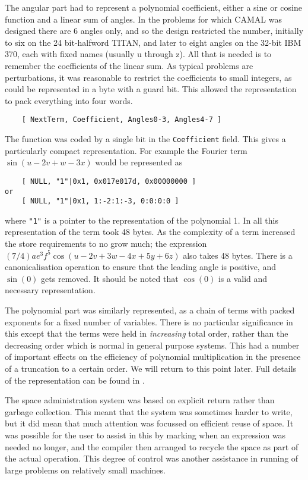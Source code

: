 The angular part had to represent a polynomial coefficient, either a
sine or cosine function and a linear sum of angles.  In the problems
for which CAMAL was designed there are 6 angles only, and so the
design restricted the number, initially to six on the 24 bit-halfword
TITAN, and later to eight angles on the 32-bit IBM 370, each with
fixed names (usually u through z).  All that is needed is to remember
the coefficients of the linear sum.  As typical problems are
perturbations, it was reasonable to restrict the coefficients to small
integers, as could be represented in a byte with a guard bit.  This
allowed the representation to pack everything into four words.
\begin{verbatim}
    [ NextTerm, Coefficient, Angles0-3, Angles4-7 ]
\end{verbatim}
The function was coded by a single bit in the {\tt Coefficient} field.  This
gives a particularly compact representation.  For example the Fourier
term $\sin(u-2v+w-3x)$ would be represented as
\begin{verbatim}
    [ NULL, "1"|0x1, 0x017e017d, 0x00000000 ]
or
    [ NULL, "1"|0x1, 1:-2:1:-3, 0:0:0:0 ]
\end{verbatim}
where {\tt "1"} is a pointer to the representation of the polynomial
1.  In all this representation of the term took 48 bytes.  As the
complexity of a term increased the store requirements to no grow much;
the expression $(7/4) a e^3 f^5 \cos(u-2v+3w-4x+5y+6z)$ also takes 48
bytes.  There is a canonicalisation operation to ensure that the
leading angle is positive, and $\sin(0)$ gets removed.  It should be
noted that $\cos(0)$ is a valid and necessary representation.

The polynomial part was similarly represented, as a chain of terms
with packed exponents for a fixed number of variables.  There is no
particular significance in this except that the terms were held in
{\em increasing} total order, rather than the decreasing order which
is normal in general purpose systems.  This had a number of important
effects on the efficiency of polynomial multiplication in the presence
of a truncation to a certain order.  We will return to this point
later.  Full details of the representation can be found in
\cite{LectureNotes}.

The space administration system was based on explicit return rather
than garbage collection.  This meant that the system was sometimes
harder to write, but it did mean that much attention was focussed on
efficient reuse of space.  It was possible for the user to assist in
this by marking when an expression was needed no longer, and the
compiler then arranged to recycle the space as part of the actual
operation.  This degree of control was another assistance in running
of large problems on relatively small machines.

